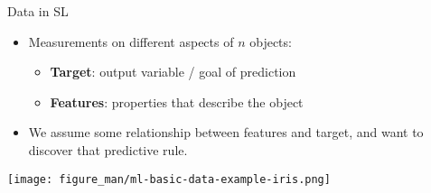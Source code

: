 \documentclass[11pt,compress,t,notes=noshow, xcolor=table]{beamer}
\begin{document}
\begin{vbframe}{Data in SL}

\begin{itemize}

  \item Measurements on different aspects of $n$ objects:
  
  \begin{itemize}
  
    \item \textbf{Target}: output variable / goal of prediction

    \item \textbf{Features}: properties that describe the object 
    

  \end{itemize}
  
  \item We assume some relationship between features and target, and want to discover that predictive rule.
\end{itemize}
\vspace{1em}
{
\texttt{[image: figure\_man/ml-basic-data-example-iris.png]} 
}

\end{vbframe}

\end{document}

